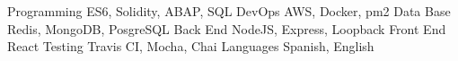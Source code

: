 


\begin{cvskills}

\cvskill
{Programming} %
{ES6, Solidity, ABAP, SQL} %
\cvskill
{DevOps} %
{AWS, Docker, pm2} %
\cvskill
{Data Base} %
{Redis, MongoDB, PosgreSQL} %
\cvskill
{Back End} %
{NodeJS, Express, Loopback} %
\cvskill
{Front End} %
{React} %
\cvskill
{Testing} %
{Travis CI, Mocha, Chai} %
\cvskill
{Languages} %
{Spanish, English} %
\end{cvskills}
